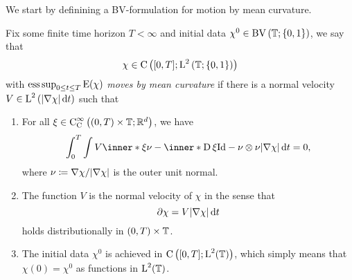 We start by definining a BV-formulation for motion by mean curvature.

\begin{definition}
	\label{motion_by_mcv}
	Fix some finite time horizon $ T < \infty $ and initial data $ \chi^{ 0 }\in \operatorname{BV} \left( \operatorname{\mathbb{T}} ; \{ 0 , 1 \} \right) $, we say that 
	\begin{equation*}
		\chi \in 
		\operatorname{C} \left(
			[ 0 , T ] ; \operatorname{L}^{ 2 } \left( \operatorname{\mathbb{T}} ; \{ 0 , 1 \}  \right)
		\right)
	\end{equation*}
	with $ \operatorname*{ess\,sup}_{ 0 \leq t \leq T } \operatorname{E} ( \chi ) $ \emph{moves by mean curvature} if there is a normal velocity
	$ V \in \operatorname{L}^{ 2 } \left( \abs{ \nabla \chi } \dd{ t } \right) $ such that 
	\begin{enumerate}
		\item 
		For all 
		$ \xi \in \operatorname{C}_{ \mathrm{ C } }^{ \infty } \left( ( 0 , T ) \times \operatorname{\mathbb{T}} ; \mathbb{ R }^{ d } \right) $,
		we have
		\begin{equation}
			\label{integral_formulation_of_mcf}
			\int_{ 0 }^{ T }
				\int
					V \inner*{ \xi }{ \nu }
					- 
					\inner*{ \diff \xi }{ \mathrm{ Id } - \nu \otimes \nu }
				\abs{ \nabla \chi }
			\dd{ t }
			=
			0,
		\end{equation}
		where $ \nu \coloneqq \nabla \chi / \abs{ \nabla \chi } $ is the outer unit normal.
	\item 
	The function $ V $ is the normal velocity of $ \chi $ in the sense that 
	\begin{equation*}
		\partial \chi
		=
		V
		\abs{ \nabla \chi }
		\dd{ t }
	\end{equation*}
	holds distributionally in $ ( 0 , T ) \times \operatorname{\mathbb{T}} $.
	\item 
	The initial data $ \chi^{ 0 } $ is achieved in $ \operatorname{C} \left( [ 0 , T ] ; \operatorname{L}^{  2 } ( \operatorname{\mathbb{T}} ) \right) $, which simply means that $ \chi ( 0 ) = \chi^{ 0 } $ as functions in $ \operatorname{L}^{ 2 } ( \operatorname{\mathbb{T}} ) $.
	\end{enumerate}
\end{definition}

